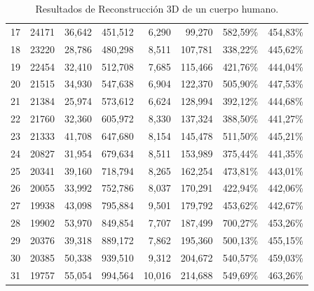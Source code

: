 \begin{table}[h]
\begin{tabular}{rrrrrrrr}
      17    & 24171 & 36,642 & 451,512 & 6,290 & 99,270 & 582,59\% & 454,83\% \\
      18    & 23220 & 28,786 & 480,298 & 8,511 & 107,781 & 338,22\% & 445,62\% \\
      19    & 22454 & 32,410 & 512,708 & 7,685 & 115,466 & 421,76\% & 444,04\% \\
      20    & 21515 & 34,930 & 547,638 & 6,904 & 122,370 & 505,90\% & 447,53\% \\
      21    & 21384 & 25,974 & 573,612 & 6,624 & 128,994 & 392,12\% & 444,68\% \\
      22    & 21760 & 32,360 & 605,972 & 8,330 & 137,324 & 388,50\% & 441,27\% \\
      23    & 21333 & 41,708 & 647,680 & 8,154 & 145,478 & 511,50\% & 445,21\% \\
      24    & 20827 & 31,954 & 679,634 & 8,511 & 153,989 & 375,44\% & 441,35\% \\
      25    & 20341 & 39,160 & 718,794 & 8,265 & 162,254 & 473,81\% & 443,01\% \\
      26    & 20055 & 33,992 & 752,786 & 8,037 & 170,291 & 422,94\% & 442,06\% \\
      27    & 19938 & 43,098 & 795,884 & 9,501 & 179,792 & 453,62\% & 442,67\% \\
      28    & 19902 & 53,970 & 849,854 & 7,707 & 187,499 & 700,27\% & 453,26\% \\
      29    & 20376 & 39,318 & 889,172 & 7,862 & 195,360 & 500,13\% & 455,15\% \\
      30    & 20385 & 50,338 & 939,510 & 9,312 & 204,672 & 540,57\% & 459,03\% \\
      31    & 19757 & 55,054 & 994,564 & 10,016 & 214,688 & 549,69\% & 463,26\% \\
    \end{tabular}%
    \caption{Resultados de Reconstrucción 3D de un cuerpo humano.}
    \label{tab:resultado-cuerpo}%
\end{table}%
  